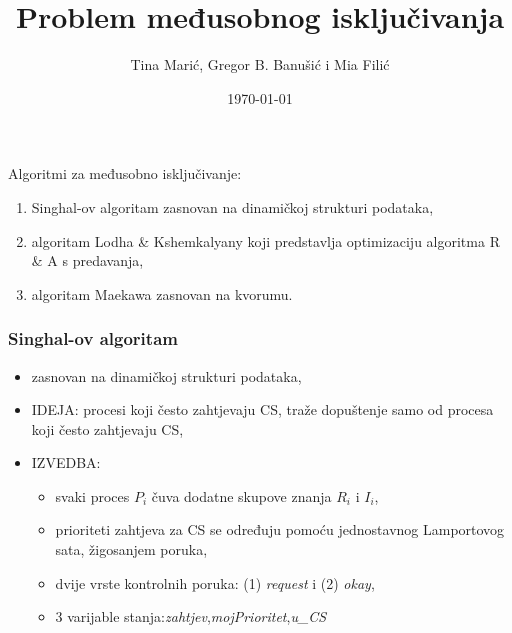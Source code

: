 \documentclass[11pt]{beamer}
\author{Tina Marić, Gregor B. Banušić i Mia Filić}
\title{Problem međusobnog isključivanja}
\subtitle{}
\institute{Prirodoslovno-matematički fakultet}
\date{\today}
\begin{document}
	\maketitle
	
	\begin{frame}
		\frametitle{}
		Algoritmi za međusobno isključivanje:%
		\begin{enumerate}
			\item Singhal-ov algoritam zasnovan na 
			dinamičkoj strukturi podataka,
			\item algoritam Lodha \& Kshemkalyany koji predstavlja optimizaciju 
			algoritma R \& A s predavanja,
			\item algoritam Maekawa zasnovan na kvorumu.
		\end{enumerate}
	\end{frame}
	\begin{frame}
		\frametitle{Singhal-ov algoritam}
		\begin{itemize}
			\item zasnovan na 
			dinamičkoj strukturi podataka,
			\item IDEJA: procesi koji često zahtjevaju CS, traže dopuštenje samo od procesa koji često zahtjevaju CS,
			\item IZVEDBA:
			\begin{itemize}
				\item svaki proces $P_i$ čuva dodatne skupove znanja $R_i$ i $I_i$,
				\item prioriteti zahtjeva za CS se određuju pomoću jednostavnog Lamportovog sata, žigosanjem poruka,
				\item dvije vrste kontrolnih poruka: (1) \textit{request} i (2) \textit{okay},
				\item 3 varijable stanja:\textit{zahtjev},\textit{mojPrioritet},\textit{u\_CS}
			\end{itemize}
		\end{itemize}
	\end{frame}
	
\end{document}
